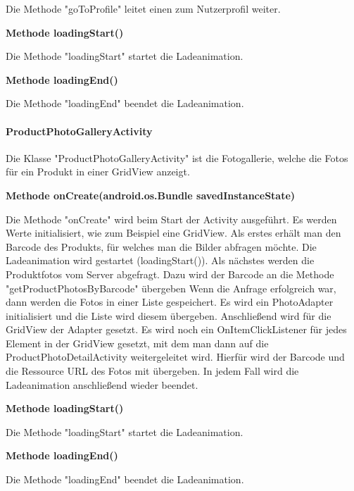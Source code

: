 \documentclass{scrartcl}
\begin{document}
\noindent Die Methode "goToProfile" leitet einen zum Nutzerprofil weiter. \newline

\noindent\textbf{Methode loadingStart()}

\noindent Die Methode "loadingStart" startet die Ladeanimation. \newline

\noindent\textbf{Methode loadingEnd()}

\noindent Die Methode "loadingEnd" beendet die Ladeanimation. \newline

\paragraph{ProductPhotoGalleryActivity}
Die Klasse "ProductPhotoGalleryActivity" ist die Fotogallerie, welche die Fotos für ein Produkt in einer GridView anzeigt. \newline 

\noindent\textbf{Methode onCreate(android.os.Bundle savedInstanceState)}

\noindent Die Methode "onCreate" wird beim Start der Activity ausgeführt. Es werden Werte initialisiert, wie zum Beispiel eine GridView. Als erstes erhält man den Barcode des Produkts, für welches man die Bilder abfragen möchte. Die Ladeanimation wird gestartet (loadingStart()). Als nächstes werden die Produktfotos vom Server abgefragt. Dazu wird der Barcode an die Methode "getProductPhotosByBarcode" übergeben Wenn die Anfrage erfolgreich war, dann werden die Fotos in einer Liste gespeichert. Es wird ein PhotoAdapter initialisiert und die Liste wird diesem übergeben. Anschließend wird für die GridView der Adapter gesetzt. Es wird noch ein OnItemClickListener für jedes Element in der GridView gesetzt, mit dem man dann auf die ProductPhotoDetailActivity weitergeleitet wird. Hierfür wird der Barcode und die Ressource URL des Fotos mit übergeben. In jedem Fall wird die Ladeanimation anschließend wieder beendet. \newline 

\noindent\textbf{Methode loadingStart()}

\noindent Die Methode "loadingStart" startet die Ladeanimation. \newline

\noindent\textbf{Methode loadingEnd()}

\noindent Die Methode "loadingEnd" beendet die Ladeanimation. \newline
\end{document}
